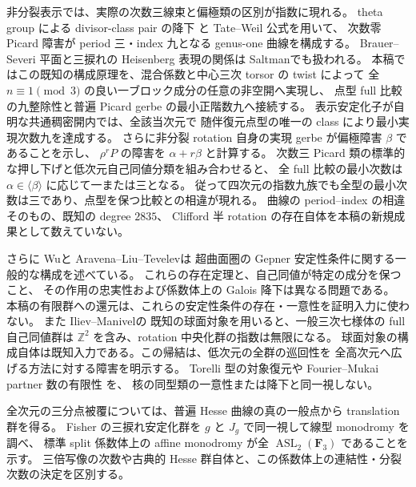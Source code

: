 非分裂表示では、実際の次数三線束と偏極類の区別が指数に現れる。
theta group による divisor-class pair の降下
\cite[Proposition~2.2, Lemma~2.4]{NFMCremonaFisherDescentAlgebra}と
Tate--Weil 公式\cite[Theorem~3.7]{NFMCiperianiKrashen}を用いて、
次数零 Picard 障害が period 三・index 九となる genus-one 曲線を構成する。
Brauer--Severi 平面と三捩れの Heisenberg 表現の関係は
Saltman\cite[Sections~3--4, Theorem~5]{NFMSaltmanSeveri}でも扱われる。
本稿ではこの既知の構成原理を、混合係数と中心三次 torsor の twist によって
全 $n\equiv1\pmod3$ の良い一ブロック成分の任意の非空開へ実現し、
点型 full 比較の九整除性と普遍 Picard gerbe の最小正階数九へ接続する。
表示安定化子が自明な共通稠密開内では、全該当次元で
随伴復元点型の唯一の class により最小実現次数九を達成する。
さらに非分裂 rotation 自身の実現 gerbe が偏極障害 $\beta$ であることを示し、
$\rho^rP$ の障害を $\alpha+r\beta$ と計算する。
次数三 Picard 類の標準的な押し下げと低次元自己同値分類を組み合わせると、
全 full 比較の最小次数は $\alpha\in\langle\beta\rangle$ に応じて一または三となる。
従って四次元の指数九族でも全型の最小次数は三であり、点型を保つ比較との相違が現れる。
曲線の period--index の相違そのもの、既知の degree $2835$、
Clifford 半 rotation の存在自体を本稿の新規成果として数えていない。

さらに Wu\cite[Theorems~1.1, 1.3, Proposition~7.2]{NFMWuStability}と
Aravena--Liu--Tevelev\cite[Theorem~1.2]{NFMAravenaLiuTevelevGepner}は
超曲面圏の Gepner 安定性条件に関する一般的な構成を述べている。
これらの存在定理と、自己同値が特定の成分を保つこと、
その作用の忠実性および係数体上の Galois 降下は異なる問題である。
本稿の有限群への還元は、これらの安定性条件の存在・一意性を証明入力に使わない。
また Iliev--Manivel\cite[Proposition~3.1, Corollary~5.3]{NFMIlievManivelSevenfold}の
既知の球面対象を用いると、一般三次七様体の full 自己同値群は
$\mathbb Z^2$ を含み、rotation 中央化群の指数は無限になる。
球面対象の構成自体は既知入力である。この帰結は、低次元の全群の巡回性を
全高次元へ広げる方法に対する障害を明示する。
Torelli 型の対象復元や Fourier--Mukai partner 数の有限性
\cite{NFPirozhkov,NFMLinRennemoZhangWeighted,NFMLinZengZhangSingularity,NFMLinZhangPartners}を、
核の同型類の一意性または降下と同一視しない。

全次元の三分点被覆については、普遍 Hesse 曲線の真の一般点から translation 群を得る。
Fisher の三捩れ安定化群を $g$ と $J_g$ で同一視して線型 monodromy を調べ、
標準 split 係数体上の affine monodromy が全 $\operatorname{ASL}_2(\mathbf F_3)$ であることを示す。
三倍写像の次数や古典的 Hesse 群自体と、この係数体上の連結性・分裂次数の決定を区別する。

